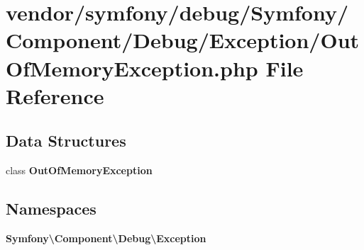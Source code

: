 \section{vendor/symfony/debug/\+Symfony/\+Component/\+Debug/\+Exception/\+Out\+Of\+Memory\+Exception.php File Reference}
\label{_out_of_memory_exception_8php}
\subsection*{Data Structures}
\begin{DoxyCompactItemize}
\item 
class {\bf Out\+Of\+Memory\+Exception}
\end{DoxyCompactItemize}
\subsection*{Namespaces}
\begin{DoxyCompactItemize}
\item 
 {\bf Symfony\textbackslash{}\+Component\textbackslash{}\+Debug\textbackslash{}\+Exception}
\end{DoxyCompactItemize}
